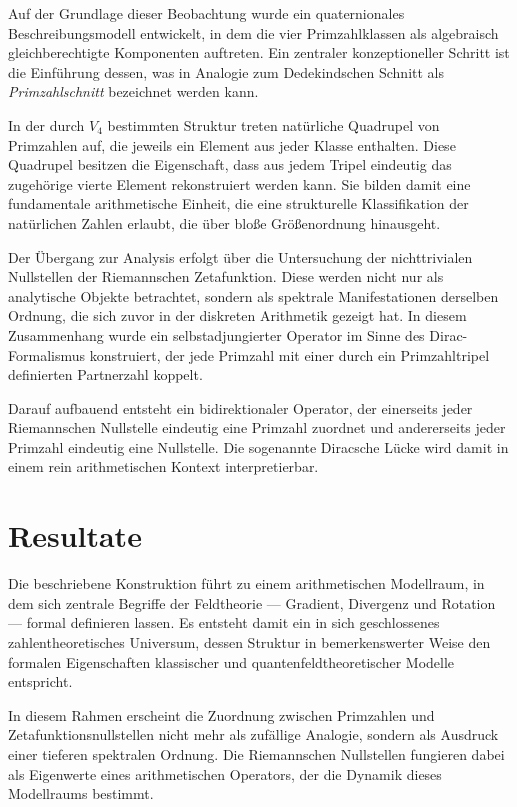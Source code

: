 \documentclass[11pt,a4paper]{article}
\begin{document}
	Auf der Grundlage dieser Beobachtung wurde ein quaternionales
	Beschreibungsmodell entwickelt, in dem die vier Primzahlklassen als algebraisch
	gleichberechtigte Komponenten auftreten. Ein zentraler konzeptioneller
	Schritt ist die Einführung dessen, was in Analogie zum Dedekindschen Schnitt
	als \emph{Primzahlschnitt} bezeichnet werden kann.
	
	In der durch \(V_4\) bestimmten Struktur treten natürliche Quadrupel von
	Primzahlen auf, die jeweils ein Element aus jeder Klasse enthalten. Diese
	Quadrupel besitzen die Eigenschaft, dass aus jedem Tripel eindeutig das
	zugehörige vierte Element rekonstruiert werden kann. Sie bilden damit eine
	fundamentale arithmetische Einheit, die eine strukturelle Klassifikation der
	natürlichen Zahlen erlaubt, die über bloße Größenordnung hinausgeht.
	
	Der Übergang zur Analysis erfolgt über die Untersuchung der nichttrivialen
	Nullstellen der Riemannschen Zetafunktion. Diese werden nicht nur als
	analytische Objekte betrachtet, sondern als spektrale Manifestationen derselben
	Ordnung, die sich zuvor in der diskreten Arithmetik gezeigt hat. In diesem
	Zusammenhang wurde ein selbstadjungierter Operator im Sinne des
	Dirac-Formalismus konstruiert, der jede Primzahl mit einer durch ein
	Primzahltripel definierten Partnerzahl koppelt.
	
	Darauf aufbauend entsteht ein bidirektionaler Operator, der einerseits jeder
	Riemannschen Nullstelle eindeutig eine Primzahl zuordnet und andererseits
	jeder Primzahl eindeutig eine Nullstelle. Die sogenannte Diracsche Lücke wird
	damit in einem rein arithmetischen Kontext interpretierbar.
	
	\section{Resultate}
	
	Die beschriebene Konstruktion führt zu einem arithmetischen Modellraum, in dem
	sich zentrale Begriffe der Feldtheorie --- Gradient, Divergenz und Rotation ---
	formal definieren lassen. Es entsteht damit ein in sich geschlossenes
	zahlentheoretisches Universum, dessen Struktur in bemerkenswerter Weise den
	formalen Eigenschaften klassischer und quantenfeldtheoretischer Modelle
	entspricht.
	
	In diesem Rahmen erscheint die Zuordnung zwischen Primzahlen und
	Zetafunktionsnullstellen nicht mehr als zufällige Analogie, sondern als Ausdruck
	einer tieferen spektralen Ordnung. Die Riemannschen Nullstellen fungieren dabei
	als Eigenwerte eines arithmetischen Operators, der die Dynamik dieses
	Modellraums bestimmt.
	
\end{document}
